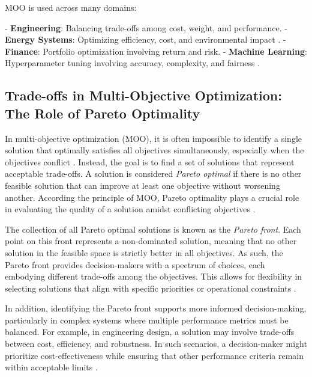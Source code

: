 MOO is used across many domains:

- \textbf{Engineering}: Balancing trade-offs among cost, weight, and performance.
- \textbf{Energy Systems}: Optimizing efficiency, cost, and environmental impact \cite{Multi-objective}.
- \textbf{Finance}: Portfolio optimization involving return and risk.
- \textbf{Machine Learning}: Hyperparameter tuning involving accuracy, complexity, and fairness \cite{An efficient neural architecture search system}.


\subsection{Trade-offs in Multi-Objective Optimization: The Role of Pareto Optimality}

In multi-objective optimization (MOO), it is often impossible to identify a single solution that optimally satisfies all objectives simultaneously, especially when the objectives conflict \cite{Nonlinear multiobjective optimization}. Instead, the goal is to find a set of solutions that represent acceptable trade-offs. A solution is considered \textit{Pareto optimal} if there is no other feasible solution that can improve at least one objective without worsening another. According the principle of MOO, Pareto optimality plays a crucial role in evaluating the quality of a solution amidst conflicting objectives \cite{Nonlinear multiobjective optimization}.

The collection of all Pareto optimal solutions is known as the \textit{Pareto front}. Each point on this front represents a non-dominated solution, meaning that no other solution in the feasible space is strictly better in all objectives. As such, the Pareto front provides decision-makers with a spectrum of choices, each embodying different trade-offs among the objectives. This allows for flexibility in selecting solutions that align with specific priorities or operational constraints \cite{Nonlinear multiobjective optimization}.

In addition, identifying the Pareto front supports more informed decision-making, particularly in complex systems where multiple performance metrics must be balanced. For example, in engineering design, a solution may involve trade-offs between cost, efficiency, and robustness. In such scenarios, a decision-maker might prioritize cost-effectiveness while ensuring that other performance criteria remain within acceptable limits \cite{Nonlinear multiobjective optimization}.

